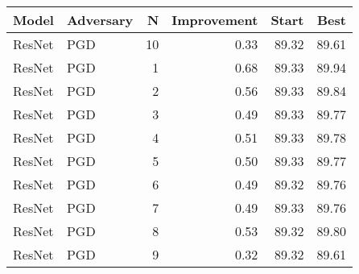 \begin{tabular}{llrrrr}
\toprule
  Model & Adversary &   N &  Improvement &  Start &   Best \\
\midrule
 ResNet &       PGD &  10 &         0.33 &  89.32 &  89.61 \\
 ResNet &       PGD &   1 &         0.68 &  89.33 &  89.94 \\
 ResNet &       PGD &   2 &         0.56 &  89.33 &  89.84 \\
 ResNet &       PGD &   3 &         0.49 &  89.33 &  89.77 \\
 ResNet &       PGD &   4 &         0.51 &  89.33 &  89.78 \\
 ResNet &       PGD &   5 &         0.50 &  89.33 &  89.77 \\
 ResNet &       PGD &   6 &         0.49 &  89.32 &  89.76 \\
 ResNet &       PGD &   7 &         0.49 &  89.33 &  89.76 \\
 ResNet &       PGD &   8 &         0.53 &  89.32 &  89.80 \\
 ResNet &       PGD &   9 &         0.32 &  89.32 &  89.61 \\
\bottomrule
\end{tabular}
